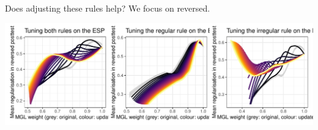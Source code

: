 \documentclass[
]{article}
\begin{document}
Does adjusting these rules help? We focus on reversed.

\includegraphics{figures/rulemove1-1.pdf}
\end{document}

